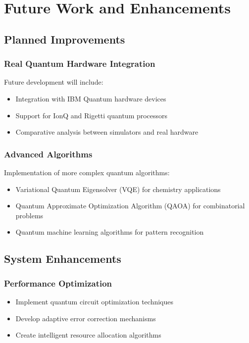 \documentclass[conference]{IEEEtran}
\begin{document}
\section{Future Work and Enhancements}

\subsection{Planned Improvements}

\subsubsection{Real Quantum Hardware Integration}
Future development will include:
\begin{itemize}
    \item Integration with IBM Quantum hardware devices
    \item Support for IonQ and Rigetti quantum processors
    \item Comparative analysis between simulators and real hardware
\end{itemize}

\subsubsection{Advanced Algorithms}
Implementation of more complex quantum algorithms:
\begin{itemize}
    \item Variational Quantum Eigensolver (VQE) for chemistry applications
    \item Quantum Approximate Optimization Algorithm (QAOA) for combinatorial problems
    \item Quantum machine learning algorithms for pattern recognition
\end{itemize}

\subsection{System Enhancements}

\subsubsection{Performance Optimization}
\begin{itemize}
    \item Implement quantum circuit optimization techniques
    \item Develop adaptive error correction mechanisms
    \item Create intelligent resource allocation algorithms
\end{itemize}
\end{document}
